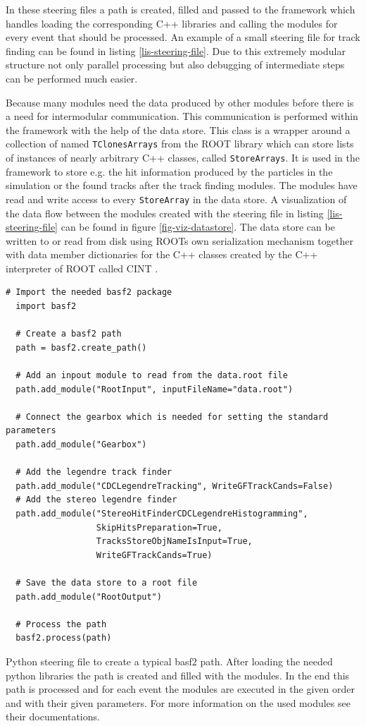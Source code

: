 In these steering files a path is created, filled and passed to the framework which handles loading the corresponding C++ libraries and calling the modules for every event that should be processed. An example of a small steering file for track finding can be found in listing \ref{lis-steering-file}. Due to this extremely modular structure not only parallel processing but also debugging of intermediate steps can be performed much easier.

Because many modules need the data produced by other modules before there is a need for intermodular communication. This communication is performed within the framework with the help of the data store. This class is a wrapper around a collection of named \texttt{TClonesArrays} from the ROOT library \cite{tclonesarray} which can store lists of instances of nearly arbitrary C++ classes, called \texttt{StoreArrays}. It is used in the framework to store e.g. the hit information produced by the particles in the simulation or the found tracks after the track finding modules. The modules have read and write access to every \texttt{StoreArray} in the data store. A visualization of the data flow between the modules created with the steering file in listing \ref{lis-steering-file} can be found in figure \ref{fig-viz-datastore}. The data store can be written to or read from disk using ROOTs own serialization mechanism together with data member dictionaries for the C++ classes created by the C++ interpreter of ROOT called CINT \cite{cint}.

\begin{listing}
 \begin{lstlisting}[style=customP]
  # Import the needed basf2 package
  import basf2

  # Create a basf2 path
  path = basf2.create_path()

  # Add an inpout module to read from the data.root file
  path.add_module("RootInput", inputFileName="data.root")
  
  # Connect the gearbox which is needed for setting the standard parameters
  path.add_module("Gearbox")

  # Add the legendre track finder
  path.add_module("CDCLegendreTracking", WriteGFTrackCands=False)
  # Add the stereo legendre finder
  path.add_module("StereoHitFinderCDCLegendreHistogramming",
                  SkipHitsPreparation=True,
                  TracksStoreObjNameIsInput=True,
                  WriteGFTrackCands=True)
  
  # Save the data store to a root file
  path.add_module("RootOutput")

  # Process the path
  basf2.process(path)

 \end{lstlisting}
 \caption[Python steering file to create a typical basf2 path.]{Python steering file to create a typical basf2 path. After loading the needed python libraries the path is created and filled with the modules. In the end this path is processed and for each event the modules are executed in the given order and with their given parameters. For more information on the used modules see their documentations.}
 \label{lis-steering-file}
\end{listing}


